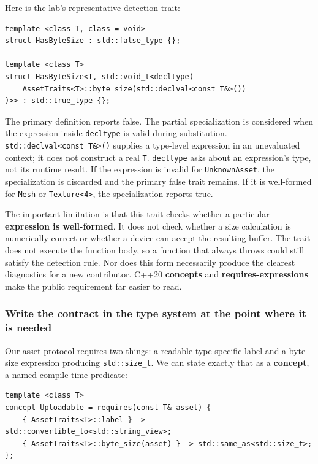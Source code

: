 Here is the lab's representative detection trait:

\begin{verbatim}
template <class T, class = void>
struct HasByteSize : std::false_type {};

template <class T>
struct HasByteSize<T, std::void_t<decltype(
    AssetTraits<T>::byte_size(std::declval<const T&>())
)>> : std::true_type {};
\end{verbatim}

The primary definition reports false. The partial specialization is considered when the expression inside \texttt{decltype} is valid during substitution. \texttt{std::declval\textless{}const\ T\&\textgreater{}()} supplies a type-level expression in an unevaluated context; it does not construct a real \texttt{T}. \texttt{decltype} asks about an expression's type, not its runtime result. If the expression is invalid for \texttt{UnknownAsset}, the specialization is discarded and the primary false trait remains. If it is well-formed for \texttt{Mesh} or \texttt{Texture\textless{}4\textgreater{}}, the specialization reports true.

The important limitation is that this trait checks whether a particular \textbf{expression is well-formed}. It does not check whether a size calculation is numerically correct or whether a device can accept the resulting buffer. The trait does not execute the function body, so a function that always throws could still satisfy the detection rule. Nor does this form necessarily produce the clearest diagnostics for a new contributor. C++20 \textbf{concepts} and \textbf{requires-expressions} make the public requirement far easier to read.

\subsubsection{Write the contract in the type system at the point where it is needed}\label{write-the-contract-in-the-type-system-at-the-point-where-it-is-needed}

Our asset protocol requires two things: a readable type-specific label and a byte-size expression producing \texttt{std::size\_t}. We can state exactly that as a \textbf{concept}, a named compile-time predicate:

\begin{verbatim}
template <class T>
concept Uploadable = requires(const T& asset) {
    { AssetTraits<T>::label } -> std::convertible_to<std::string_view>;
    { AssetTraits<T>::byte_size(asset) } -> std::same_as<std::size_t>;
};
\end{verbatim}


